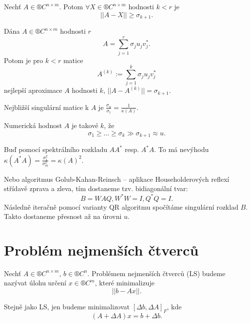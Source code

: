 \documentclass[12pt]{article}					%
\begin{document}
\begin{lemma}
	Nechť $A \in ®C^{n \times m}$. Potom $\forall X \in ®C^{n \times m}$ hodnosti $k < r$ je
	$$ ||A - X|| ≥ \sigma_{k+1}. $$
\end{lemma}

\begin{veta}
	Dána $A \in ®C^{n \times m}$ hodnosti $r$
	$$ A = \sum_{j=1}^r \sigma_j u_j v_j^*. $$
	Potom je pro $k < r$ matice
	$$ A^{(k)} := \sum_{j=1}^k \sigma_j u_j v_j^* $$
	nejlepší aproximace $A$ hodnosti $k$, $||A - A^{(k)}|| = \sigma_{k+1}$.
\end{veta}

\begin{dusledek}
	Nejbližší singulární matice k $A$ je $\frac{\sigma_n}{\sigma_1} = \frac{1}{\kappa(A)}$.
\end{dusledek}

\begin{definice}
	Numerická hodnost $A$ je takové $k$, že
	$$ \sigma_1 ≥ … ≥ \sigma_k \gg \sigma_{k+1} \approx u. $$
\end{definice}

\begin{poznamka}
	Buď pomocí spektrálního rozkladu $A A^*$ resp. $A^* A$. To má nevýhodu $\kappa(A^* A) = \frac{\sigma_1^2}{\sigma_m^2} = \kappa(A)^2$.

	Nebo algoritmus Golub-Kahan-Reinsch – aplikace Householderových reflexí střídavě zprava a zleva, tím dostaneme tzv. bidiagonální tvar:
	$$ B = WAQ, W^*W = I, Q^*Q = I. $$
	Následně iteračně pomocí varianty QR algoritmu spočítáme singulární rozklad $B$. Takto dostaneme přesnost až na úrovni $u$.
\end{poznamka}


\section{Problém nejmenších čtverců}
\begin{definice}
	Nechť $A \in ®C^{n \times m}$, $b \in ®C^n$. Problémem nejmenších čtverců (LS) budeme nazývat úlohu určení $x \in ®C^m$, které minimalizuje
	$$ ||b - Ax||. $$
\end{definice}

\begin{definice}
	Stejně jako LS, jen budeme minimalizovat $[\Delta b, \Delta A]_F$, kde
	$$ (A + \Delta A)x = b + \Delta b. $$
\end{definice}
\end{document}

